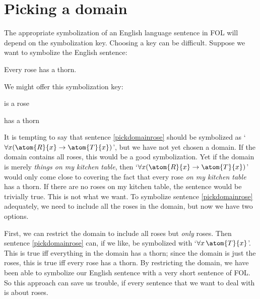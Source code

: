 \section{Picking a domain}
The appropriate symbolization of an English language sentence in FOL will depend on the symbolization key. Choosing a key can be difficult. Suppose we want to symbolize the English sentence:
	\begin{earg}
		\item[\ex{pickdomainrose}] Every rose has a thorn.
	\end{earg}
We might offer this symbolization key:
	\begin{ekey}
		\item[\atom{R}{x}]  is a rose
		\item[\atom{T}{x}]  has a thorn
	\end{ekey}
It is tempting to say that sentence \ref{pickdomainrose} should be symbolized as `$\forall x(\atom{R}{x} \eif \atom{T}{x})$', but we have not yet chosen a domain. If the domain contains all roses, this would be a good symbolization. Yet if the domain is merely \emph{things on my kitchen table}, then `$\forall x(\atom{R}{x} \eif \atom{T}{x})$' would only come close to covering the fact that every rose \emph{on my kitchen table} has a thorn. If there are no roses on my kitchen table, the sentence would be trivially true. This is not what we want. To symbolize sentence \ref{pickdomainrose} adequately, we need to include all the roses in the domain, but now we have two options.

First, we can restrict the domain to include all roses but \emph{only} roses. Then sentence \ref{pickdomainrose} can, if we like, be symbolized with `$\forall x\,\atom{T}{x}$'. This is true iff everything in the domain has a thorn; since the domain is just the roses, this is true iff every rose has a thorn. By restricting the domain, we have been able to symbolize our English sentence with a very short sentence of FOL. So this approach can save us trouble, if every sentence that we want to deal with is about roses.


